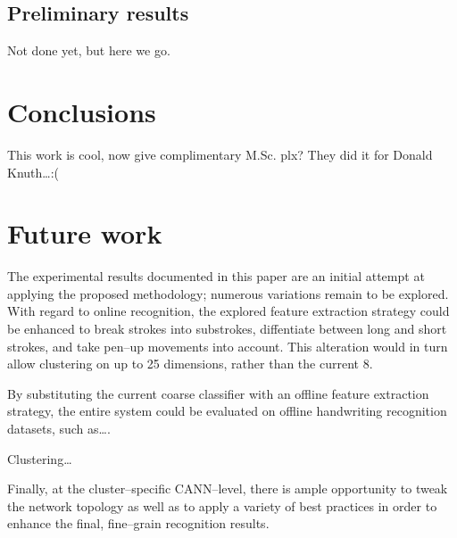 \documentclass[10pt,conference,a4paper]{IEEEtran}
\begin{document}
	\subsection{Preliminary results}

	Not done yet, but here we go.


	\section{Conclusions}

	This work is cool, now give complimentary M.Sc. plx?
	They did it for Donald Knuth\ldots :(


	\section{Future work}

	The experimental results documented in this paper are an initial attempt at applying the proposed methodology;
	numerous variations remain to be explored. With regard to online recognition, the explored feature extraction
	strategy could be enhanced to break strokes into substrokes, diffentiate between long and short strokes, and take
	pen--up movements into account. This alteration would in turn allow clustering on up to 25 dimensions, rather than the current 8.

	By substituting the current coarse classifier with an offline feature extraction strategy, the entire system could
	be evaluated on offline handwriting recognition datasets, such as\ldots. 

	Clustering\ldots

	Finally, at the cluster--specific CANN--level, there is ample opportunity to tweak the network topology as well as
	to apply a variety of best practices \cite{simard2003best} in order to enhance the final, fine--grain recognition results.



	
\end{document}
